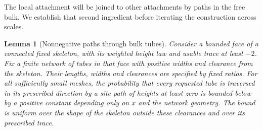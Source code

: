 \documentclass[11pt]{article}
\newtheorem{lemma}[theorem]{Lemma}
\theoremstyle{definition}
\theoremstyle{remark}
\numberwithin{equation}{section}
\begin{document}
The local attachment will be joined to other attachments by paths in
the free bulk.  We establish that second ingredient before iterating
the construction across scales.

\begin{lemma}[Nonnegative paths through bulk tubes]
\label{boundary:bulk-tubes}
Consider a bounded face of a connected fixed skeleton, with its weighted
height law and usable trace at least $-2$.  Fix a finite network of
tubes in that face with positive widths and clearance from the skeleton.
Their lengths, widths and clearances are specified by fixed ratios.
For all sufficiently small meshes, the probability that every requested
tube is traversed in its prescribed direction by a site path of heights
at least zero is bounded below by a positive constant depending only
on $x$ and the network geometry.  The bound is uniform over the shape
of the skeleton outside these clearances and over its prescribed trace.
\end{lemma}
\end{document}
